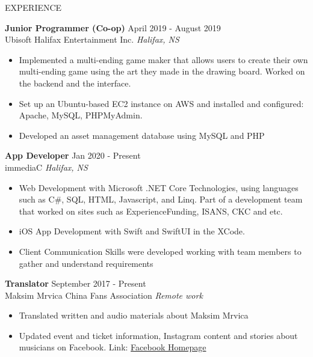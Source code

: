 \documentclass{resume} %
\begin{document}
\begin{rSection}{EXPERIENCE}

\textbf{Junior Programmer (Co-op) } \hfill April 2019 - August 2019\\
Ubisoft Halifax Entertainment Inc. \hfill \textit{Halifax, NS}
 \begin{itemize}
    \itemsep -4pt {} 
     \item  Implemented a multi-ending game maker that allows users to create their own multi-ending game using the art they made in the drawing board. Worked on the backend and the interface.
     \item Set up an Ubuntu-based EC2 instance on AWS and installed and configured: Apache, MySQL, PHPMyAdmin. 
     \item Developed an asset management database using MySQL and PHP
 \end{itemize}
 
\textbf{App Developer} \hfill Jan 2020 - Present\\
immediaC \hfill \textit{Halifax, NS}
 \begin{itemize}
    \itemsep -4pt {} 
     \item Web Development with Microsoft .NET Core Technologies, using languages such as C\#, SQL, HTML, Javascript, and Linq. Part of a development team that worked on sites such as ExperienceFunding, ISANS, CKC and etc.
     \item iOS App Development with Swift and SwiftUI in the XCode. 
     \item Client Communication Skills were developed working with team members to gather and understand requirements
 \end{itemize}

 \textbf{Translator} \hfill September 2017 - Present\\
 Maksim Mrvica China Fans Association \hfill \textit{Remote work}
 \begin{itemize}
    \itemsep -4pt {} 
     \item Translated written and audio materials about Maksim Mrvica
     \item Updated event and ticket information, Instagram content and stories about musicians on Facebook. Link: \href{https://www.facebook.com/officialmaksimchina}{Facebook Homepage}
 \end{itemize}
\end{rSection} 

\end{document}
